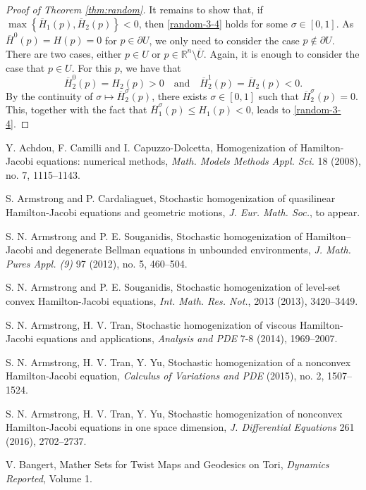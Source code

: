 \documentclass[12pt,reqno]{amsart}
\theoremstyle{plain}
\theoremstyle{remark}
\numberwithin{equation}{section}
\newcommand{\R}{\mathbb{R}}
\newcommand{\sig}{\sigma}
\newcommand{\ol}{\overline}
\begin{document}
\begin{proof}[Proof of Theorem \ref{thm:random}]
It remains to show that, if $\max\left\{\ol{H}_1(p), \ol{H}_2(p) \right\} <0$, then \eqref{random-3-4} holds for some $\sig \in [0,1]$.
As $\ol{H}^0(p)= H(p)=0$ for $p \in \partial U$, we only need to consider the case $p \notin \partial U$.
There are two cases, either $p \in U$ or $p\in \R^n \setminus \ol{U}$.
Again, it is enough to consider the case that $p \in U$.
For this $p$, we have that
\[
\ol{H}_2^0(p) = H_2(p)>0 \quad \text{and} \quad \ol{H}_2^1(p)=\ol{H}_2(p) <0.
\]
By the continuity of $\sig \mapsto \ol{H}_2^\sig(p)$, there exists $\sig \in [0,1]$ such that $\ol{H}_2^\sig(p)=0$.
This, together with the fact that $\ol{H}_1^\sig(p)\leq  H_1(p)<0$,  leads to  \eqref{random-3-4}.
\end{proof}



\begin{thebibliography}{99}

Y. Achdou, F. Camilli and  I. Capuzzo-Dolcetta, 
Homogenization of Hamilton-Jacobi equations: numerical methods,
\emph{Math. Models Methods Appl. Sci.} 18 (2008), no. 7, 1115--1143. 


S. Armstrong and P. Cardaliaguet,
Stochastic homogenization of quasilinear Hamilton-Jacobi equations and geometric motions,
\emph{J. Eur. Math. Soc.}, to appear.

S. N. Armstrong and P. E. Souganidis,
 Stochastic homogenization of Hamilton--Jacobi and
degenerate Bellman equations in unbounded environments,
\emph{J. Math. Pures Appl. (9)} 97 (2012), no. 5, 460--504.



S. N. Armstrong and P. E. Souganidis,
Stochastic homogenization of level-set convex Hamilton-Jacobi equations, 
\emph{Int. Math. Res. Not.}, 2013 (2013), 3420--3449.


S. N. Armstrong, H. V. Tran,
Stochastic homogenization of viscous Hamilton-Jacobi equations and applications,
\emph{Analysis and PDE} 7-8 (2014), 1969--2007.

 S. N. Armstrong, H. V. Tran, Y. Yu,
Stochastic homogenization of a nonconvex Hamilton-Jacobi equation, 
\emph{Calculus of Variations and PDE} (2015), no. 2, 1507--1524.

  S. N. Armstrong, H. V. Tran, Y. Yu,
Stochastic homogenization of nonconvex Hamilton-Jacobi equations in one space dimension, 
\emph{J. Differential Equations} 261 (2016), 2702--2737.

 V. Bangert,  Mather Sets for Twist Maps and Geodesics on Tori, \emph{Dynamics Reported}, Volume
1.


\end{thebibliography}
\end{document}

